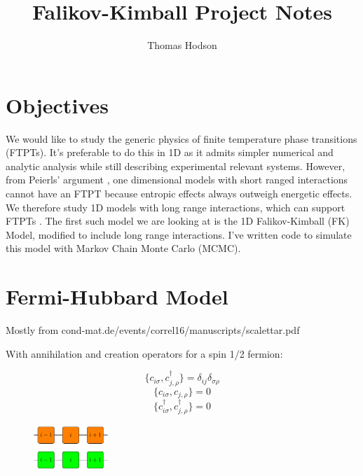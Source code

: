 \documentclass[a4paper, 11pt, onecolumn]{article}
\begin{document}
\title{Falikov-Kimball Project Notes}
\author{Thomas Hodson}
\maketitle

\section{Objectives}
We would like to study the generic physics of finite temperature phase transitions (FTPTs). It's preferable to do this in 1D as it admits simpler numerical and analytic analysis while still describing experimental relevant systems. However, from Peierls' argument \cite{peierls_isings_1936}, one dimensional models with short ranged interactions cannot have an FTPT because entropic effects always outweigh energetic effects. We therefore study 1D models with long range interactions, which can support FTPTs \cite{dyson_existence_1969,thouless_long-range_1969,anderson_exact_1969}. The first such model we are looking at is the 1D Falikov-Kimball (FK) Model, modified to include long range interactions. I've written code to simulate this model with Markov Chain Monte Carlo (MCMC). 

\section{Fermi-Hubbard Model}
Mostly from cond-mat.de/events/correl16/manuscripts/scalettar.pdf

With annihilation and creation operators for a spin 1/2 fermion:
\begin{multicols}{3}
\noindent
  \begin{equation*}
    \{c_{i\sigma}, c^\dag_{j,\rho}\} = \delta_{ij}\delta_{\sigma \rho}
  \end{equation*}
  \begin{equation*}
    \{c_{i\sigma}, c_{j,\rho}\} = 0
  \end{equation*}
    \begin{equation*}
    \{c^\dag_{i\sigma}, c^\dag_{j,\rho}\} = 0
  \end{equation*}
\end{multicols}

\begin{figure}
  \begin{center}
    \includegraphics[width=0.25\textwidth]{FH_diagram}
  \end{center}
\end{figure}
\end{document}
